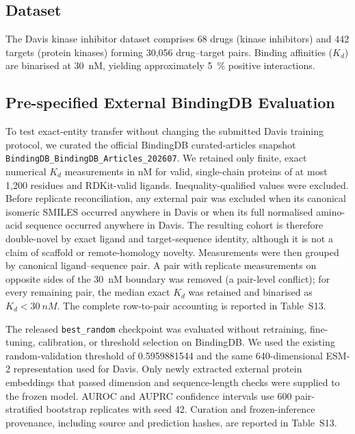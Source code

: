 \documentclass[fleqn,10pt]{wlscirep}
\begin{document}
\subsection{Dataset}

The Davis kinase inhibitor
dataset\cite{davis2011comprehensive} comprises 68 drugs (kinase inhibitors)
and 442 targets (protein kinases) forming 30{,}056 drug--target pairs.  Binding
affinities ($K_d$) are binarised at \SI{30}{nM}, yielding approximately
\SI{5}{\percent} positive interactions.

\subsection{Pre-specified External BindingDB Evaluation}

To test exact-entity transfer without changing the submitted Davis training
protocol, we curated the official BindingDB curated-articles snapshot
\texttt{BindingDB\_BindingDB\_Articles\_202607}\cite{gilson2016bindingdb}.
We retained only finite, exact numerical $K_d$ measurements in nM for valid,
single-chain proteins of at most 1{,}200 residues and RDKit-valid ligands.
Inequality-qualified values were excluded. Before replicate reconciliation, any
external pair was excluded when its canonical isomeric
SMILES occurred anywhere in Davis or when its full normalised amino-acid
sequence occurred anywhere in Davis.  The resulting cohort is therefore
double-novel by exact ligand and target-sequence identity, although it is not a
claim of scaffold or remote-homology novelty. Measurements were then grouped by
canonical ligand--sequence pair. A pair with replicate measurements on opposite
sides of the \SI{30}{nM} boundary was removed (a pair-level conflict); for every
remaining pair, the median exact $K_d$ was retained and binarised as
$K_d<\SI{30}{nM}$. The complete row-to-pair accounting is reported in
Table~S13.

The released \texttt{best\_random} checkpoint was evaluated without retraining,
fine-tuning, calibration, or threshold selection on BindingDB.  We used the
existing random-validation threshold of 0.5959881544 and the same
640-dimensional ESM-2 representation used for Davis. Only newly extracted
external protein embeddings that passed dimension and sequence-length checks
were supplied to the frozen model.
AUROC and AUPRC confidence intervals use 600 pair-stratified bootstrap
replicates with seed 42.  Curation and frozen-inference provenance, including
source and prediction hashes, are reported in Table~S13.
\end{document}
